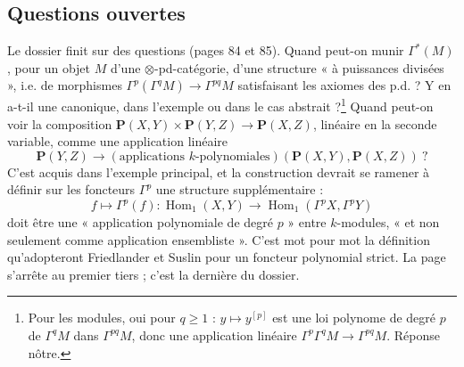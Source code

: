 \documentclass[11pt,a4paper]{article}
\begin{document}
\subsection*{Questions ouvertes}

Le dossier finit sur des questions (pages 84 et 85). Quand peut-on munir
$\Gamma^{*}(M)$, pour un objet $M$ d'une $\otimes$-pd-catégorie, d'une
structure « à puissances divisées », i.e. de morphismes $\Gamma^{p}(\Gamma^{q}M)
\to \Gamma^{pq}M$ satisfaisant les axiomes des p.d. ? Y en a-t-il une
canonique, dans l'exemple ou dans le cas abstrait ?\footnote{Pour les
modules, oui pour $q \geqslant 1$ : $y \mapsto y^{[p]}$ est une loi polynome
de degré $p$ de $\Gamma^{q}M$ dans $\Gamma^{pq}M$, donc une application
linéaire $\Gamma^{p}\Gamma^{q}M \to \Gamma^{pq}M$. Réponse nôtre.} Quand
peut-on voir la composition $\mathbf{P}(X, Y) \times \mathbf{P}(Y, Z) \to
\mathbf{P}(X, Z)$, linéaire en la seconde variable, comme une application
linéaire
\[
  \mathbf{P}(Y, Z) \to (\text{applications } k\text{-polynomiales})
  (\mathbf{P}(X, Y), \mathbf{P}(X, Z)) \ ?
\]
C'est acquis dans l'exemple principal, et la construction devrait se ramener
à définir sur les foncteurs $\Gamma^{p}$ une structure supplémentaire :
\[
  f \mapsto \Gamma^{p}(f) : \operatorname{Hom}_{1}(X, Y) \to
  \operatorname{Hom}_{1}(\Gamma^{p}X, \Gamma^{p}Y)
\]
doit être une « application polynomiale de degré $p$ » entre $k$-modules,
« et non seulement comme application ensembliste ». C'est mot pour mot la
définition qu'adopteront Friedlander et Suslin pour un foncteur polynomial
strict. La page s'arrête au premier tiers ; c'est la dernière du dossier.
\end{document}
